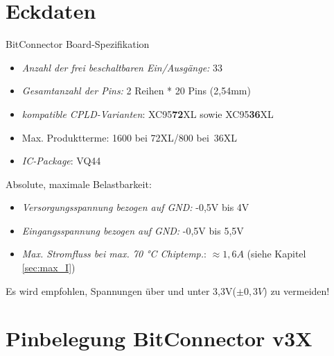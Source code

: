 \documentclass{article}
\begin{document}
\section{Eckdaten} 

BitConnector Board-Spezifikation
\begin{itemize}
	\item \textit{Anzahl der frei beschaltbaren Ein/Ausgänge:} \hspace{0.3cm} 33
	\item \textit{Gesamtanzahl der Pins:} \hspace{3.6cm} 2 Reihen * 20 Pins (2,54mm)
	\item \textit{kompatible CPLD-Varianten}: \hspace{2.8cm} XC95\textbf{72}XL sowie XC95\textbf{36}XL
	\item Max. Produktterme: \hspace{4.1cm} 1600 bei 72XL/800 bei~36XL
	\item \textit{IC-Package}: \hspace{5.3cm} VQ44 
\end{itemize}

Absolute, maximale Belastbarkeit:
\begin{itemize}
	\item \textit{Versorgungsspannung bezogen auf GND:} \hspace{1cm} -0,5V bis 4V
	\item \textit{Eingangsspannung bezogen auf GND:} \hspace{1.45cm} -0,5V bis 5,5V
	\item \textit{Max. Stromfluss bei max. 70 \si{\celsius} Chiptemp.}:\hspace{0.6cm} $\approx1,6A$ (siehe Kapitel \ref{sec:max_I})
\end{itemize}

Es wird empfohlen, Spannungen über und unter 3,3V($\pm 0,3V$) zu vermeiden!

\section{Pinbelegung BitConnector v3X}
\label{sec:Pins}
\end{document}
